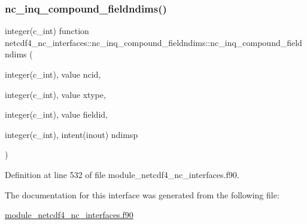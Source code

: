 \subsubsection{\texorpdfstring{nc\+\_\+inq\+\_\+compound\+\_\+fieldndims()}{nc\_inq\_compound\_fieldndims()}}
{\footnotesize\ttfamily integer(c\+\_\+int) function netcdf4\+\_\+nc\+\_\+interfaces\+::nc\+\_\+inq\+\_\+compound\+\_\+fieldndims\+::nc\+\_\+inq\+\_\+compound\+\_\+fieldndims (\begin{DoxyParamCaption}\item[{integer(c\+\_\+int), value}]{ncid,  }\item[{integer(c\+\_\+int), value}]{xtype,  }\item[{integer(c\+\_\+int), value}]{fieldid,  }\item[{integer(c\+\_\+int), intent(inout)}]{ndimsp }\end{DoxyParamCaption})}



Definition at line 532 of file module\+\_\+netcdf4\+\_\+nc\+\_\+interfaces.\+f90.



The documentation for this interface was generated from the following file\+:\begin{DoxyCompactItemize}
\item 
\hyperlink{module__netcdf4__nc__interfaces_8f90}{module\+\_\+netcdf4\+\_\+nc\+\_\+interfaces.\+f90}\end{DoxyCompactItemize}
